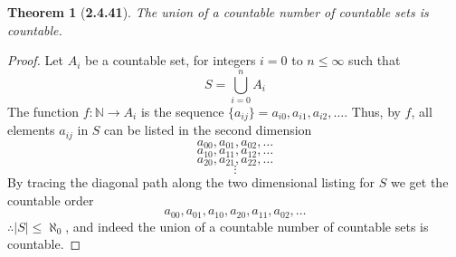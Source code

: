\documentclass[a4paper, 12pt]{article}
\theoremstyle{plain}
\newtheorem*{theorem*}{Theorem}
\begin{document}
	
\begin{theorem*}[\textbf{2.4.41}]
    The union of a countable number of countable sets is countable.
\end{theorem*}

\begin{proof}
    Let $A_i$ be a countable set, for integers $i=0$ to $n \leq \infty$ 
    such that
    $$S = \bigcup_{i=0}^{n} A_i$$ 
    The function $f: \mathbb{N} \rightarrow A_i$ is the sequence 
    $\{a_{ij}\} = a_{i0}, a_{i1}, a_{i2}, \dots$. 
    Thus, by $f$, all elements $a_{ij}$ in $S$ can be listed in the second dimension
    $$a_{00}, a_{01}, a_{02}, \dots$$
    $$a_{10}, a_{11}, a_{12}, \dots$$
    $$a_{20}, a_{21}, a_{22}, \dots$$
    $$\vdots$$
    By tracing the diagonal path along the two 
    dimensional listing for $S$ we get the countable order 
    $$a_{00}, a_{01}, a_{10}, a_{20}, a_{11}, a_{02}, \dots$$
    $\therefore |S| \leq \aleph_0$, and indeed the union of a countable number of 
    countable sets is countable.
\end{proof}
\end{document}
